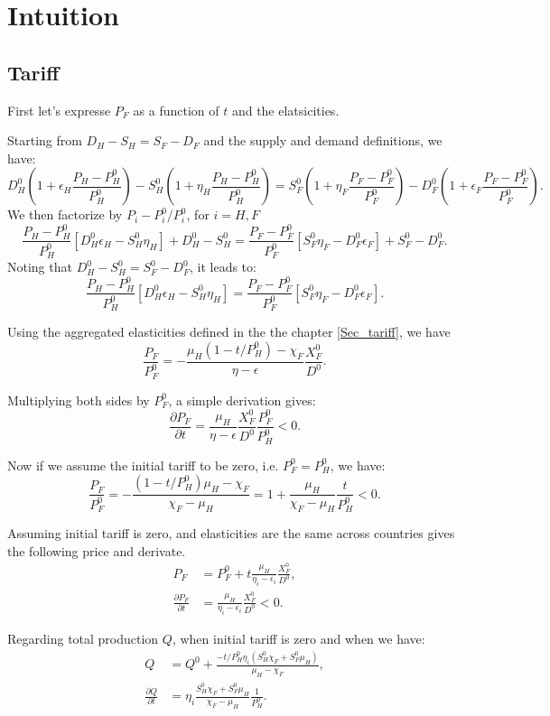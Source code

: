\chapter{Intuition}\label{appendix:intuitions}

\section{Tariff}\label{appendix:intuitions_tariff}

First let's expresse $P_F$ as a function of $t$ and the elatsicities.

Starting from $D_H-S_H = S_F-D_F$ and the supply and demand definitions, we have: 
$$
D_H^0\left(1+\epsilon_H \frac{P_H - P_H^0}{P_H^0}\right) - S_H^0\left(1+\eta_H \frac{P_H - P_H^0}{P_H^0}\right) = S_F^0 \left(1+\eta_F \frac{P_F - P_F^0}{P_F^0}\right) - D_F^0\left(1+\epsilon_F \frac{P_F - P_F^0}{P_F^0}\right).
$$
We then factorize by $P_i-P_i^0/P_i^0$, for $i = H,F$
$$
\frac{P_H - P_H^0}{P_H^0} [D_H^0 \epsilon_H - S_H^0 \eta_H] + D_H^0 - S_H^0 = \frac{P_F - P_F^0}{P_F^0} [S_F^0 \eta_F - D_F^0 \epsilon_F] + S_F^0 - D_F^0.
$$
Noting that $D_H^0-S_H^0=S_F^0-D_F^0$, it leads to:
$$
\frac{P_H - P_H^0}{P_H^0} [D_H^0 \epsilon_H - S_H^0 \eta_H] = \frac{P_F - P_F^0}{P_F^0} [S_F^0 \eta_F - D_F^0 \epsilon_F].
$$

Using the aggregated elasticities defined in the the chapter \ref{Sec_tariff}, we have 
$$\frac{P_F}{P_F^0}= -\frac{\mu_H (1 - t/P_H^0) - \chi_F}{\eta-\epsilon}\frac{X_F^0}{D^0}.$$

Multiplying both sides by $P_F^0$, a simple derivation gives:
$$
\frac{\partial P_F}{\partial t} = \frac{\mu_H}{\eta - \epsilon}  \frac{X_F^0}{D^0} \frac{P_F^0}{P_H^0}<0.
$$

Now if we assume the initial tariff to be zero, i.e. $P_F^0 = P_H^0$, we have:
$$
\frac{P_F}{P_F^0} = - \frac{(1 - t/P_H^0)\mu_H - \chi_F}{\chi_F - \mu_H}=1+\frac{\mu_H}{\chi_F - \mu_H}\frac{t}{P_H^0} < 0.
$$

Assuming initial tariff is zero, and elasticities are the same across
countries gives the following price and derivate.
\begin{align*}
P_F &= P_F^0 + t \frac{\mu_H}{\eta_i-\epsilon_i} \frac{X_F^0}{D^0}, \\
\frac{\partial P_F}{\partial t} &= \frac{\mu_H}{\eta_i-\epsilon_i} \frac{X_F^0}{D^0} < 0.
\end{align*}

Regarding total production $Q$, when initial tariff is zero and when we have:
\begin{align*}
Q &= Q^0 + \frac{- t/P_H^0 \eta_i(S_H^0 \chi_F + S_F^0 \mu_H)}{\mu_H - \chi_F}, \\
\frac{\partial Q}{\partial t} &= \eta_i \frac{S_H^0 \chi_F + S_F^0 \mu_H}{\chi_F - \mu_H}\frac{1}{P_H^0}.
\end{align*}

